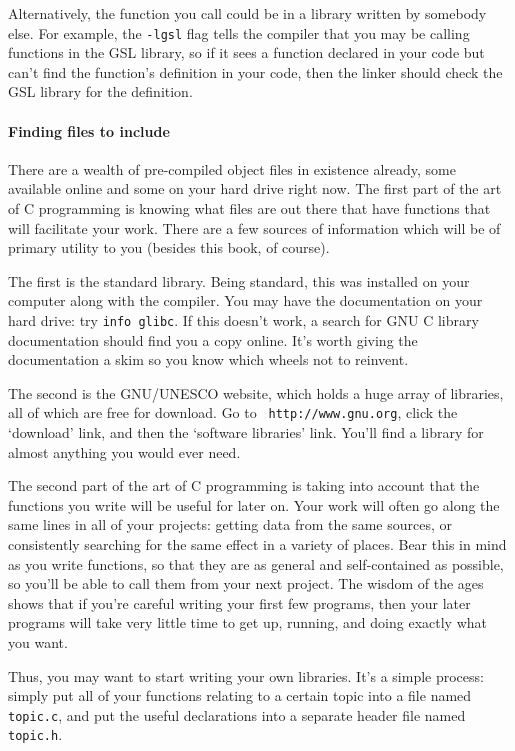 \documentclass[12pt]{article}
\begin{document}
Alternatively, the function you call could be in a library written by
somebody else.  For example, the {\tt -lgsl} flag tells the compiler that
you may be calling functions in the GSL library, so if it sees a function
declared in your code but can't find the function's definition in your
code, then the linker should check the GSL library for the definition.


\paragraph{Finding files to include}
There are a wealth of pre-compiled object files in existence already,
some available online and some on your hard drive right now.  The first
part of the art of C programming is knowing what files are out there that have
functions that will facilitate your work. There
are a few sources of information which will be of primary utility to you
(besides this book, of course).

The first is the standard library. Being standard, this was
installed on your computer along with the compiler. You may have the
documentation on your hard drive: try {\tt info glibc}. If this doesn't
work, a search for GNU C library documentation should find you a copy
online. It's worth giving the documentation a skim so you know which wheels not to reinvent.

The second is the GNU/UNESCO website, which holds a huge array
of libraries, all of which are free for download. Go to {\tt
http://www.gnu.org}, click the `download' link, and then the `software
libraries' link. You'll find a library for almost anything you would
ever need.

The second part of the art of C programming is taking into account that
the functions you write will be useful for later on. Your work will often
go along the same lines in all of your projects: getting data from the
same sources, or consistently searching for the same effect in a
variety of places. Bear this in mind as you write functions, so that they
are as general and self-contained as possible, so you'll be able to call
them from your next project. The wisdom of the ages shows that if you're
careful writing your first few programs, then your later programs will
take very little time to get up, running, and doing exactly what you want.

Thus, you may want to start writing your own libraries. It's a simple
process: simply put all of your functions relating to a certain topic
into a file named {\tt topic.c}, and put the useful declarations into a separate header file named {\tt
topic.h}. 
\end{document}
